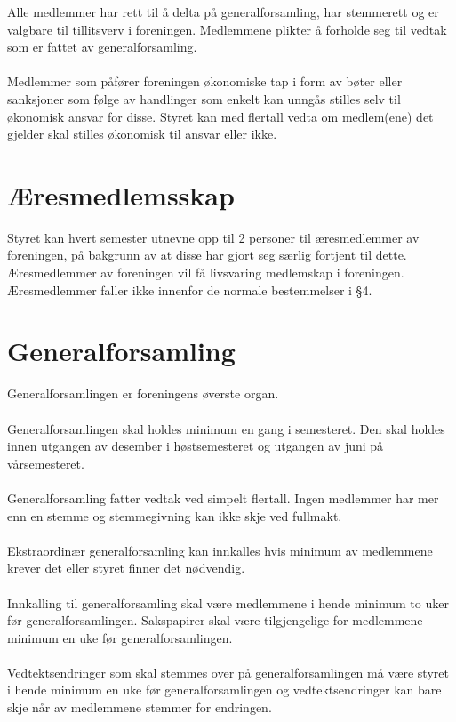 \documentclass[12pt,a4paper,norsk]{article}
\begin{document}
Alle medlemmer har rett til å delta på generalforsamling, har stemmerett og er valgbare til tillitsverv i
foreningen. Medlemmene plikter å forholde seg til vedtak som er fattet av generalforsamling.
\\
\\
Medlemmer som påfører foreningen økonomiske tap i form av bøter eller sanksjoner som følge 
av handlinger som enkelt kan unngås stilles selv til økonomisk ansvar for disse. Styret kan med  flertall vedta om medlem(ene) det gjelder skal stilles økonomisk til ansvar eller ikke.



\section{Æresmedlemsskap}

Styret kan hvert semester utnevne opp til 2 personer til æresmedlemmer av foreningen, på bakgrunn av at disse har gjort seg særlig fortjent til dette. Æresmedlemmer av foreningen vil få livsvaring medlemskap i foreningen. Æresmedlemmer faller ikke innenfor de normale bestemmelser i §4.



\section{Generalforsamling}

Generalforsamlingen er foreningens øverste organ.
\\
\\
Generalforsamlingen skal holdes minimum en gang i semesteret. Den skal holdes innen utgangen av
desember i høstsemesteret og utgangen av juni på vårsemesteret.
\\
\\
Generalforsamling fatter vedtak ved simpelt flertall. Ingen medlemmer har mer enn en stemme
og stemmegivning kan ikke skje ved fullmakt.
\\
\\
Ekstraordinær generalforsamling kan innkalles hvis minimum  av medlemmene krever det
eller styret finner det nødvendig.
\\
\\
Innkalling til generalforsamling skal være medlemmene i hende minimum to uker før
generalforsamlingen. Sakspapirer skal være tilgjengelige for medlemmene minimum en uke før
generalforsamlingen.
\\
\\
Vedtektsendringer som skal stemmes over på generalforsamlingen må være styret i hende
minimum en uke før generalforsamlingen og vedtektsendringer kan bare skje når  av
medlemmene stemmer for endringen.
\end{document}
